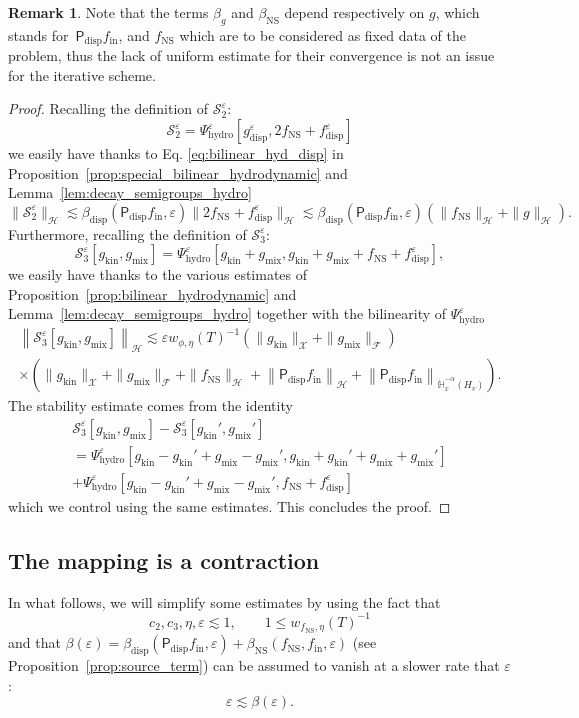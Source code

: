 \documentclass[10pt]{amsart}
\theoremstyle{definition}\newtheorem{defi}[theo]{Definition}\newtheorem{rema}[theo]{Remark}\newtheorem{exam}[theo]{Example}\newtheorem{exem}[theo]{Example}\newtheorem{nota}[theo]{Notation}
\newcommand{\ini}{\mathrm{in}}
\newcommand{\ns}{\mathrm{NS}}
\newcommand{\hyd}{\mathrm{hydro}}
\newcommand{\mix}{\mathrm{mix}}
\newcommand{\kin}{\mathrm{kin}}
\newcommand{\disp}{\mathrm{disp}}
\newcommand{\bbH}{\mathbb{H}}
\newcommand{\HH}{\mathcal{H}}
\newcommand{\PP}{\mathsf{P}}
\renewcommand{\SS}{\mathcal{S}}
\newcommand{\FFF}{\mathscr{F}}
\newcommand{\HHH}{\mathscr{H}}
\newcommand{\GGG}{\mathscr{X}}
\newcommand{\Ss}{H}
\newcommand{\SSs}{\HH}
\newcommand{\SSSs}{\HHH}
\newcommand{\SSSl}{\GGG}
\newcommand{\SSSm}{\FFF}
\renewcommand*\le{\leqslant}
\newcommand*\eps{{\varepsilon}}
\begin{document}
\begin{rema}
Note that the terms $\beta_{g}$ and $\beta_\ns$ depend respectively on $g$, which stands for~$\PP_\disp f_\ini$, and $f_\ns$ which are to be considered as fixed data of the problem, thus the lack of uniform estimate for their convergence is not an issue for the iterative scheme.
\end{rema}
\begin{proof}
Recalling the definition of $\SS^\eps_2$:
\[
\SS^\eps_2 = \Psi^\eps_\hyd\left[g^\eps_\disp, 2 f_\ns + f^\eps_\disp \right]
\]
we easily have thanks to Eq. \eqref{eq:bilinear_hyd_disp} in Proposition~\ref{prop:special_bilinear_hydrodynamic} and Lemma~\ref{lem:decay_semigroups_hydro}
\[
\| \SS^\eps_2 \|_\SSSs \lesssim \beta_\disp(\PP_\disp f_\ini, \eps) \| 2f_\ns + f^\eps_\disp\|_\SSSs \lesssim \beta_\disp(\PP_\disp f_\ini, \eps) \left(\| f_\ns \|_\SSSs + \| g \|_{\SSs}\right).
\]
Furthermore, recalling the definition of $\SS^\eps_3$:
\[
\SS^\eps_3[g_\kin, g_\mix] = \Psi^\eps_\hyd\left[g_\kin + g_\mix, g_\kin + g_\mix + f_\ns + f^\eps_\disp \right],
\]
we easily have thanks to the various estimates of Proposition~\ref{prop:bilinear_hydrodynamic} and Lemma~\ref{lem:decay_semigroups_hydro} together with the bilinearity of $\Psi^\eps_\hyd$
\begin{multline*}
\left\| \SS^\eps_3[g_\kin, g_\mix] \right\|_{ \SSSs}
\lesssim \eps w_{\phi, \eta}(T)^{-1} \left(\| g_\kin \|_\SSSl + \| g_\mix \|_\SSSm \right) \\
\times \left(\| g_\kin \|_\SSSl + \| g_\mix \|_\SSSm + \| f_\ns \|_\SSSs + \left\| \PP_\disp f_\ini \right\|_{ \SSs } + \left\| \PP_\disp f_\ini \right\|_{ \dot{\bbH}^{-\alpha}_x \left(\Ss_v \right) } \right).
\end{multline*}
The stability estimate comes from the identity
\begin{multline*}
\SS^\eps_3[g_\kin, g_\mix] - \SS^\eps_3\left[g_\kin', g_\mix'\right] \\
= \Psi^\eps_\hyd\left[g_\kin - g_\kin' + g_\mix - g_\mix', g_\kin + g_\kin' + g_\mix + g_\mix' \right] \\
 + \Psi^\eps_\hyd\left[g_\kin - g_\kin' + g_\mix - g_\mix', f_\ns + f_\disp^\eps \right]
\end{multline*}
which we control using the same estimates. This concludes the proof.
\end{proof}


\subsection{The mapping is a contraction}\label{scn:mapping_contraction}
In what follows, we will simplify some estimates by using the fact that
\[
c_2, c_3, \eta, \eps \lesssim 1, \qquad 1 \le w_{f_\ns, \eta}(T)^{-1}
\]
and that $\beta(\eps) = {\beta_{\disp}}(\PP_\disp f_\ini, \eps) + \beta_{\ns}(f_\ns, f_\ini, \eps)$ (see Proposition~\ref{prop:source_term}) can be assumed to vanish at a slower rate that $\eps$:
\[
\eps \lesssim \beta(\eps).
\]
\end{document}
